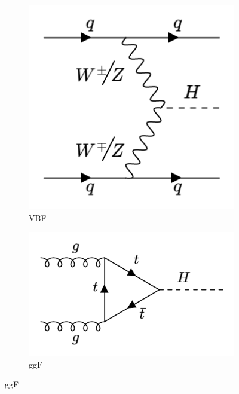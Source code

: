 \begin{figure}[htp]
  \centering
       \begin{subfigure}[b]{0.3\textwidth}
         \centering
         \includegraphics[width=\textwidth]{figures/theory_chapter/VBF.png}
         \caption{VBF}
         \label{fig:VBF}
     \end{subfigure}
     \hfill
         \begin{subfigure}[b]{0.3\textwidth}
         \centering
         \includegraphics[width=\textwidth]{figures/theory_chapter/ggF.png}
         \caption{ggF}
         \label{fig:ggH}
     \end{subfigure}

\end{figure}
